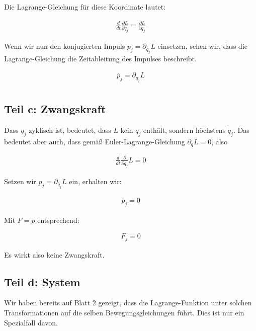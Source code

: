 \documentclass[a4paper,german,12pt,smallheadings]{scrartcl}
\begin{document}
Die Lagrange-Gleichung für diese Koordinate lautet:

\begin{align*}
  \frac{d}{dt}\frac{\partial L}{\partial \dot{q}_j} = \frac{\partial L}{\partial q_j}
\end{align*}


Wenn wir nun den konjugierten Impuls $p_j = \partial_\dot{q_j} L$ einsetzen, sehen
wir, dass die Lagrange-Gleichung die Zeitableitung des Impulses beschreibt.

\begin{align*}
  \dot{p_j} = \partial_{q_j} L\\
\end{align*}
\subsection*{Teil c: Zwangskraft}

Dass $q_j$ zyklisch ist, bedeutet, dass $L$ kein $q_j$ enthält, sondern
höchstens $\dot{q}_j$. Das bedeutet aber auch, dass gemäß
Euler-Lagrange-Gleichung $\partial_q L = 0$, also

\begin{align*}
  \frac{d}{dt} \frac{\partial}{\partial \dot{q}_j} L = 0
\end{align*}

Setzen wir $p_j = \partial_\dot{q_j} L$ ein, erhalten wir:

\begin{align*}
  \dot{p_j} = 0
\end{align*}

Mit $F = \dot{p}$ entsprechend:

\begin{align*}
  F_j = 0
\end{align*}

Es wirkt also keine Zwangskraft.

\subsection*{Teil d: System}
Wir haben bereits auf Blatt 2 gezeigt, dass die Lagrange-Funktion unter solchen
Transformationen auf die selben Bewegungsgleichungen führt. Dies ist nur ein
Spezialfall davon.
\end{document}

